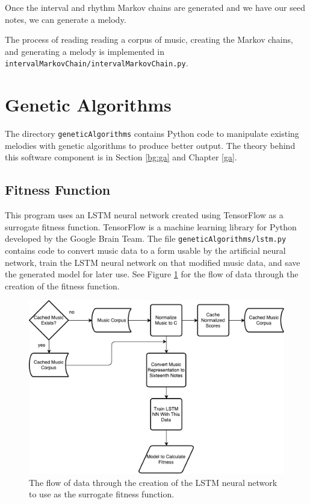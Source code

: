 Once the interval and rhythm Markov chains are generated and we have our seed notes, we can generate a melody.

The process of reading reading a corpus of music, creating the Markov chains, and generating a melody is implemented in \texttt{intervalMarkovChain/intervalMarkovChain.py}.

\section{Genetic Algorithms} \label{software:ga}

The directory \texttt{geneticAlgorithms} contains Python code to manipulate existing melodies with genetic algorithms to produce better output.
The theory behind this software component is in Section \ref{bg:ga} and Chapter \ref{ga}.

\subsection{Fitness Function} \label{software:ga:fitness}

This program uses an LSTM neural network created using TensorFlow as a surrogate fitness function.
TensorFlow is a machine learning library for Python developed by the Google Brain Team.
The file \texttt{geneticAlgorithms/lstm.py} contains code to convert music data to a form usable by the artificial neural network, train the LSTM neural network on that modified music data, and save the generated model for later use.
See Figure \ref{fig:lstmflowchart} for the flow of data through the creation of the fitness function.

\begin{figure}[h!]
	\centering
	\includegraphics[width=\linewidth]{figures/lstm_flowchart.pdf}
	\caption{The flow of data through the creation of the LSTM neural network to use as the surrogate fitness function.}
	\label{fig:lstmflowchart}
\end{figure}

